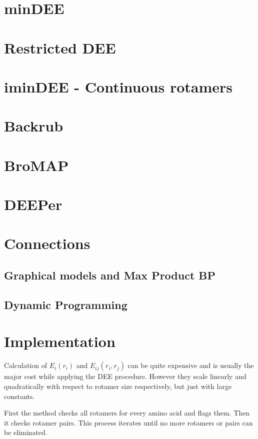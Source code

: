 \documentclass[a4]{article}
\begin{document}
\section{minDEE}

\section{Restricted DEE}

\section{iminDEE - Continuous rotamers}

\section{Backrub}

\section{BroMAP}

\section{DEEPer}

\section{Connections}
\subsection{Graphical models and Max Product BP}

\subsection{Dynamic Programming}


\section{Implementation}
Calculation  of $E_i(r_i)$ and $E_{ij}(r_i,r_j)$ can be quite expensive and is usually the major cost while applying the DEE procedure. However they scale linearly and quadratically with respect to rotamer size respectively, but just with large constants. 

First the method checks all rotamers for every amino acid and flags them. Then it checks rotamer pairs. This process iterates until no more rotamers or pairs can be eliminated. 
\end{document}
